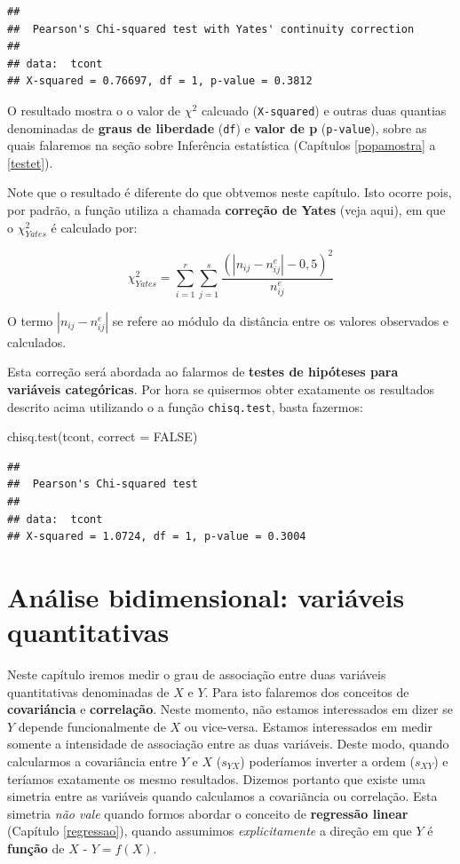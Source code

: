 \documentclass[
]{book}
\newenvironment{Shaded}{\begin{snugshade}}{\end{snugshade}}
\newcommand{\AttributeTok}[1]{\textcolor[rgb]{0.77,0.63,0.00}{#1}}
\newcommand{\ConstantTok}[1]{\textcolor[rgb]{0.00,0.00,0.00}{#1}}
\newcommand{\FunctionTok}[1]{\textcolor[rgb]{0.00,0.00,0.00}{#1}}
\newcommand{\NormalTok}[1]{#1}
\begin{document}
\begin{verbatim}
## 
##  Pearson's Chi-squared test with Yates' continuity correction
## 
## data:  tcont
## X-squared = 0.76697, df = 1, p-value = 0.3812
\end{verbatim}

O resultado mostra o o valor de \(\chi^2\) calcuado (\texttt{X-squared}) e outras duas quantias denominadas de \textbf{graus de liberdade} (\texttt{df}) e \textbf{valor de p} (\texttt{p-value}), sobre as quais falaremos na seção sobre Inferência estatística (Capítulos \ref{popamostra} a \ref{testet}).

Note que o resultado é diferente do que obtvemos neste capítulo. Isto ocorre pois, por padrão, a função utiliza a chamada \textbf{correção de Yates} (veja aqui), em que o \(\chi_{Yates}^{2}\) é calculado por:

\[\chi_{Yates}^{2} = \sum_{i=1}^{r}\sum_{j=1}^{s}\frac{(|n_{ij} - n_{ij}^{e}| - 0,5)^2}{n_{ij}^{e}}\]

O termo \(|n_{ij} - n_{ij}^{e}|\) se refere ao módulo da distância entre os valores observados e calculados.

Esta correção será abordada ao falarmos de \textbf{testes de hipóteses para variáveis categóricas}. Por hora se quisermos obter exatamente os resultados descrito acima utilizando o a função \texttt{chisq.test}, basta fazermos:

\begin{Shaded}
\begin{Highlighting}[]
\FunctionTok{chisq.test}\NormalTok{(tcont, }\AttributeTok{correct =} \ConstantTok{FALSE}\NormalTok{)}
\end{Highlighting}
\end{Shaded}

\begin{verbatim}
## 
##  Pearson's Chi-squared test
## 
## data:  tcont
## X-squared = 1.0724, df = 1, p-value = 0.3004
\end{verbatim}

\hypertarget{biquant}{%
\chapter{Análise bidimensional: variáveis quantitativas}\label{biquant}}

Neste capítulo iremos medir o grau de associação entre duas variáveis quantitativas denominadas de \(X\) e \(Y\). Para isto falaremos dos conceitos de \textbf{covariáncia} e \textbf{correlação}. Neste momento, não estamos interessados em dizer se \(Y\) depende funcionalmente de \(X\) ou vice-versa. Estamos interessados em medir somente a intensidade de associação entre as duas variáveis. Deste modo, quando calcularmos a covariância entre \(Y\) e \(X\) (\(s_{YX}\)) poderíamos inverter a ordem (\(s_{XY}\)) e teríamos exatamente os mesmo resultados. Dizemos portanto que existe uma simetria entre as variáveis quando calculamos a covariãncia ou correlação. Esta simetria \emph{não vale} quando formos abordar o conceito de \textbf{regressão linear} (Capítulo \ref{regressao}), quando assumimos \emph{explicitamente} a direção em que \(Y\) é \textbf{função} de \(X\) - \(Y = f(X)\).
\end{document}
